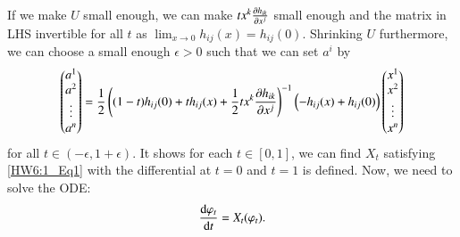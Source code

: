 \documentclass[a4paper, 12pt]{article}
\theoremstyle{Mydefinition}
\theoremstyle{Mytheorem}
\begin{document}
If we make $U$ small enough, we can make $tx^k\pdv{h_{ik}}{x^j}$ small enough and the matrix in LHS invertible for all $t$ as $\lim_{x\rightarrow 0}h_{ij}(x) = h_{ij}(0)$. Shrinking $U$ furthermore, we can choose a small enough $\epsilon>0$ such that we can set $a^i$ by
\begin{equation}\label{HW6:1_Eq2}
    \begin{pmatrix}
    a^1 \\ a^2 \\ \vdots \\ a^n
    \end{pmatrix}
    =\frac{1}{2}\left((1-t)h_{ij}(0) + th_{ij}(x) + \frac{1}{2}tx^k\pdv{h_{ik}}{x^j}\right)^{-1}
    \left(-h_{ij}(x)+h_{ij}(0)\right)
    \begin{pmatrix}
    x^1 \\ x^2 \\ \vdots \\ x^n
    \end{pmatrix}
\end{equation}
for all $t\in (-\epsilon, 1+\epsilon)$. It shows for each $t\in [0,1]$, we can find $X_t$ satisfying \eqref{HW6:1_Eq1} with the differential at $t=0$ and $t=1$ is defined. Now, we need to solve the ODE:
\begin{equation*}
    \dv{\varphi_t}{t} = X_t(\varphi_t).
\end{equation*}
\end{document}
